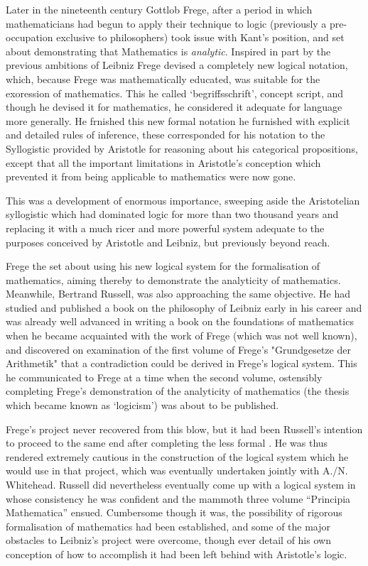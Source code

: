 Later in the nineteenth century Gottlob Frege, after a period in which mathematicians had begun to apply their technique to logic (previously a pre-occupation exclusive to philosophers) took issue with Kant's position, and set about demonstrating that Mathematics is \emph{analytic}.
Inspired in part by the previous ambitions of Leibniz Frege devised a completely new logical notation, which, because Frege was mathematically educated, was suitable for the exoression of mathematics.
This he called `begriffsschrift', concept script, and though he devised it for mathematics, he considered it adequate for language more generally.
He frnished this new formal notation he furnished with explicit and detailed rules of inference, these corresponded for his notation to the Syllogistic provided by Aristotle for reasoning about his categorical propositions, except that all the important limitations in Aristotle's conception which prevented it from being applicable to mathematics were now gone.

This was a development of enormous importance, sweeping aside the Aristotelian syllogistic which had dominated logic for more than two thousand years and replacing it with a much ricer and more powerful system adequate to the purposes conceived by Aristotle and Leibniz, but previously beyond reach.

Frege the set about using his new logical system for the formalisation of mathematics, aiming thereby to demonstrate the analyticity of mathematics.
Meanwhile, Bertrand Russell, was also approaching the same objective.
He had studied and published a book\cite{russellPL} on the philosophy of Leibniz early in his career and was already well advanced in writing a book on the foundations of mathematics\cite{russellPRM} when he became acquainted with the work of Frege (which was not well known), and discovered on examination of the first volume of Frege's "Grundgesetze der Arithmetik" \cite{frege1893} that a contradiction could be derived in Frege's logical system.
This he communicated to Frege at a time when the second volume, ostensibly completing
Frege's demonstration of the analyticity of mathematics (the thesis which became known as `logicism') was about to be published.

Frege's project never recovered from this blow, but it had been Russell's intention to proceed to the same end after completing the less formal \cite{russellORM}.
He was thus rendered extremely cautious in the construction of the logical system which he would use in that project, which was eventually undertaken jointly with A./N. Whitehead.
Russell did nevertheless eventually come up with a logical system in whose consistency he was confident and the mammoth three volume ``Principia Mathematica''\cite{russellPM} ensued.
Cumbersome though it was, the possibility of rigorous formalisation of mathematics had been established, and some of the major obstacles to Leibniz's project were overcome, though ever detail of his own conception of how to accomplish it had been left behind with Aristotle's logic.


